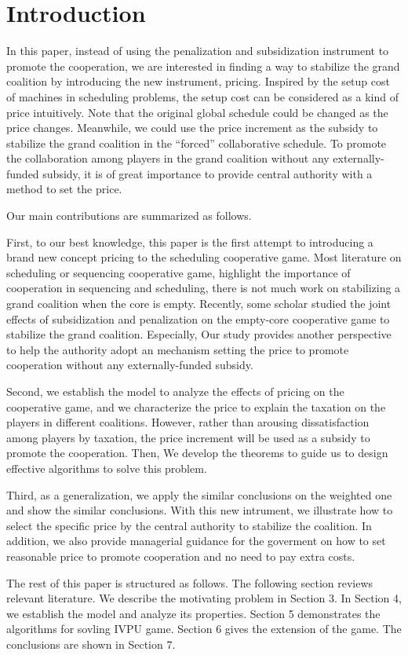 \section{Introduction}

In this paper, instead of using the penalization and subsidization instrument to promote the cooperation, we are interested in finding a way to stabilize the grand coalition by introducing the new instrument, pricing. Inspired by the setup cost of machines in scheduling problems, the setup cost can be considered as a kind of price intuitively. Note that the original global schedule could be changed as the price changes. Meanwhile, we could use the price increment as the subsidy to stabilize the grand coalition in the “forced” collaborative schedule.
To promote the collaboration among players in the grand coalition without any externally-funded subsidy, it is of great importance to provide central authority with a method to set the price.

Our main contributions are summarized as follows.

First, to our best knowledge, this paper is the first attempt to introducing a brand new concept pricing to the scheduling cooperative game. Most literature on scheduling or sequencing cooperative game, highlight the importance of cooperation in sequencing and scheduling, there is not much work on stabilizing a grand coalition when the core is empty. Recently, some scholar studied the joint effects of subsidization and penalization on the empty-core cooperative game to stabilize the grand coalition. Especially, Our study provides another perspective to help the authority adopt an mechanism setting the price to promote cooperation without any externally-funded subsidy.

Second, we establish the model to analyze the effects of pricing on the cooperative game, and we characterize the price to explain the taxation on the players in different coalitions. However, rather than arousing dissatisfaction among players by taxation, the price increment will be used as a subsidy to promote the cooperation. Then, We develop the theorems to guide us to design effective algorithms to solve this problem.

Third, as a generalization, we apply the similar conclusions on the weighted one and show the similar
conclusions. With this new intrument, we illustrate how to select the specific price by the central authority to stabilize the coalition. In addition, we also provide managerial guidance for the goverment on how to set reasonable price to promote cooperation and no need to pay extra costs.


The rest of this paper is structured as follows. The following section reviews relevant literature. We describe the motivating problem in Section 3. In Section 4, we establish the model and analyze its properties. Section 5 demonstrates the algorithms for sovling IVPU game. Section 6 gives the extension of the game. The conclusions are shown in Section 7.
